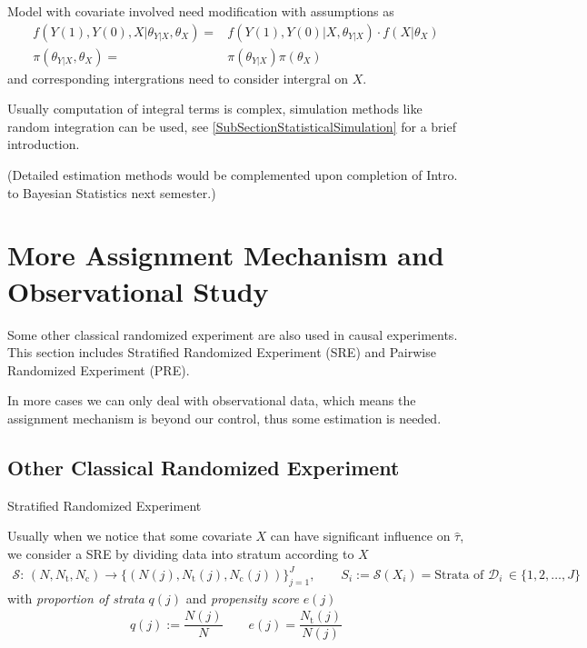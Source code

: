     Model with covariate involved need modification with assumptions as
    \begin{align}
        f\left(Y(1),Y(0),X|\theta _{Y|X},\theta _{X}\right) =& f\left(Y(1),Y(0)|X,\theta _{Y|X}\right) \cdot f\left(X|\theta _X\right)\\
        \pi(\theta _{Y|X},\theta _{X})=&\pi(\theta _{Y|X})\pi(\theta _X)
    \end{align}
    and corresponding intergrations need to consider intergral on $ X $.

    Usually computation of integral terms is complex, simulation methods like random integration can be used, see \autoref{SubSectionStatisticalSimulation} for a brief introduction.

    (Detailed estimation methods would be complemented upon completion of Intro. to Bayesian Statistics next semester.)
    


\section{More Assignment Mechanism and Observational Study}
Some other classical randomized experiment are also used in causal experiments. This section includes Stratified Randomized Experiment (SRE) and Pairwise Randomized Experiment (PRE).

In more cases we can only deal with observational data, which means the assignment mechanism is beyond our control, thus some estimation is needed.

\subsection{Other Classical Randomized Experiment}
\begin{point}
    Stratified Randomized Experiment
\end{point}

Usually when we notice that some covariate $ X $ can have significant influence on $ \hat{\tau} $, we consider a SRE by dividing data into stratum according to $ X $
\begin{align}
    \mathcal{S}:\,(N,N_\mathrm{t},N_\mathrm{c})\to \{\left(N(j),N_\mathrm{t}(j),N_\mathrm{c}(j)  \right)\}_{j=1}^J,\qquad S_i:=\mathcal{S}(X_i)=\text{Strata of }\mathcal{D}_i\,\in\{1,2,\ldots,J\}
\end{align}
with \textit{proportion of strata} $ q(j) $ and \textit{propensity score} $ e(j) $
\begin{align}
    q(j):=\dfrac{N(j)}{N}\qquad e(j)=\dfrac{N_\mathrm{t}(j) }{N(j)}
\end{align}

